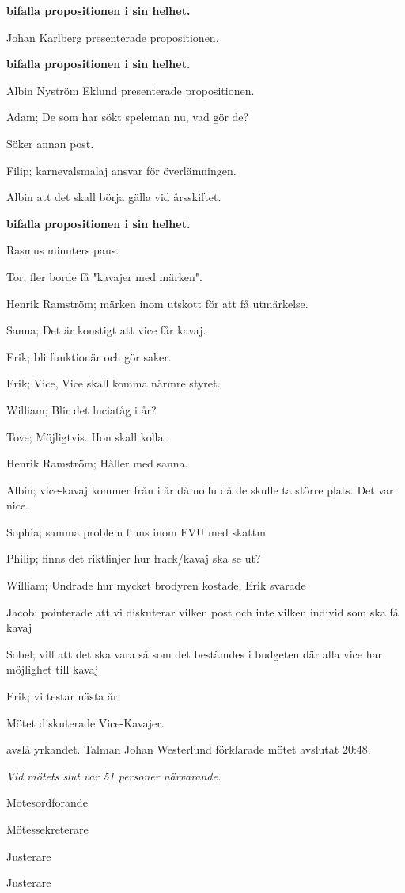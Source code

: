 \documentclass[10pt]{article}
\def\mo{Johan Westerlund}
\def\ms{Erik Månsson}
\def\ji{Anders Nilsson}
\def\jii{Pontus Landgren}
\begin{document}
\begin{paragrafer}
\begin{paragrafer}
        \textbf{\Mba bifalla propositionen i sin helhet.}

        Johan Karlberg presenterade propositionen.

        \textbf{\Mba bifalla propositionen i sin helhet.}

        Albin Nyström Eklund presenterade propositionen.

        Adam; De som har sökt speleman nu, vad gör de?

        Söker annan post.

        Filip; karnevalsmalaj ansvar för överlämningen.

        Albin \ypa att det skall börja gälla vid årsskiftet.

        \textbf{\Mba bifalla propositionen i sin helhet.}

    \end{paragrafer}

Rasmus  minuters paus.

Tor; fler borde få "kavajer med märken".

Henrik Ramström; märken inom utskott för att få utmärkelse.

Sanna; Det är konstigt att vice får kavaj.

Erik; bli funktionär och gör saker.

Erik; Vice, Vice skall komma närmre styret.

William; Blir det luciatåg i år?

Tove; Möjligtvis. Hon skall kolla.

Henrik Ramström; Håller med sanna.

Albin; vice-kavaj kommer från i år då nollu då de skulle ta större plats. Det var nice.

Sophia; samma problem finns inom FVU med skattm

Philip; finns det riktlinjer hur frack/kavaj ska se ut?

William; Undrade hur mycket brodyren kostade, Erik svarade

Jacob; pointerade att vi diskuterar vilken post och inte vilken individ som ska få kavaj

Sobel; vill att det ska vara så som det bestämdes i budgeten där alla vice har möjlighet till kavaj

Erik; vi testar nästa år.

Mötet diskuterade Vice-Kavajer.

\Mba avslå yrkandet.
Talman {\mo} förklarade mötet avslutat 20:48.

\emph{Vid mötets slut var 51 personer närvarande.}

\end{paragrafer}

\hidesignfoot
\begin{signatures}{4}
\signature{\mo}{Mötesordförande}
\signature{\ms}{Mötessekreterare}
\signature{\ji}{Justerare}
\signature{\jii}{Justerare}
\end{signatures}
\end{document}
